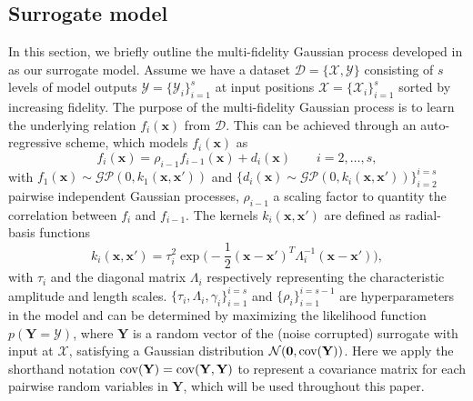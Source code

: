 \documentclass[11pt]{article}
\begin{document}
\subsection{Surrogate model}
In this section, we briefly outline the multi-fidelity Gaussian process developed in \cite{kennedy2000predicting} as our surrogate model. Assume we have a dataset $\mathcal{D}=\{\mathcal{X}, \mathcal{Y} \}$ consisting of $s$ levels of model outputs $\mathcal{Y}=\{\mathcal{Y}_i\}_{i=1}^{s}$ at input positions $\mathcal{X}=\{\mathcal{X}_i\}_{i=1}^{s}$ sorted by increasing fidelity. 
The purpose of the multi-fidelity Gaussian process is to learn the underlying relation $f_i(\mathbf{x})$ from $\mathcal{D}$. This can be achieved through an auto-regressive scheme, which models $f_i(\mathbf{x})$ as
\begin{equation}
    f_i(\mathbf{x}) = \rho_{i-1} f_{i-1}(\mathbf{x}) + d_i(\mathbf{x}) \quad \quad  i=2,\dots,s, 
\label{AR}
\end{equation}
with $f_1(\mathbf{x}) \sim \mathcal{GP}(0, k_1(\mathbf{x},\mathbf{x}'))$ and $\{d_i(\mathbf{x}) \sim \mathcal{GP}(0, k_i(\mathbf{x},\mathbf{x}'))\}_{i=2}^{i=s}$ pairwise independent Gaussian processes, $\rho_{i-1}$ a scaling factor to quantity the correlation between $f_i$ and $f_{i-1}$. The kernels $k_i(\mathbf{x},\mathbf{x}')$ are defined as radial-basis functions
\begin{equation}
     k_i(\mathbf{x},\mathbf{x}') = \tau_i^2 \exp{\big(-\frac{1}{2}(\mathbf{x}- \mathbf{x}')^T \Lambda_i^{-1}(\mathbf{x}- \mathbf{x}')\big)},
\label{RBF}
\end{equation}
with $\tau_i$ and the diagonal matrix $\Lambda_i$ respectively representing the characteristic amplitude and length scales. $\{\tau_i, \Lambda_i, \gamma_i\}_{i=1}^{i=s}$ and $\{\rho_i\}_{i=1}^{i=s-1}$ are hyperparameters in the model and can be determined by maximizing the likelihood function $p(\mathbf{Y}=\mathcal{Y})$, where $\mathbf{Y}$ is a random vector of the (noise corrupted) surrogate with input at $\mathcal{X}$, satisfying a Gaussian distribution $\mathcal{N}(\mathbf{0}, {\rm{cov}}(\mathbf{Y}))$. Here we apply the shorthand notation ${\rm{cov}}(\mathbf{Y})={\rm{cov}}(\mathbf{Y},\mathbf{Y})$ to represent a covariance matrix for each pairwise random variables in $\mathbf{Y}$, which will be used throughout this paper.
\end{document}
